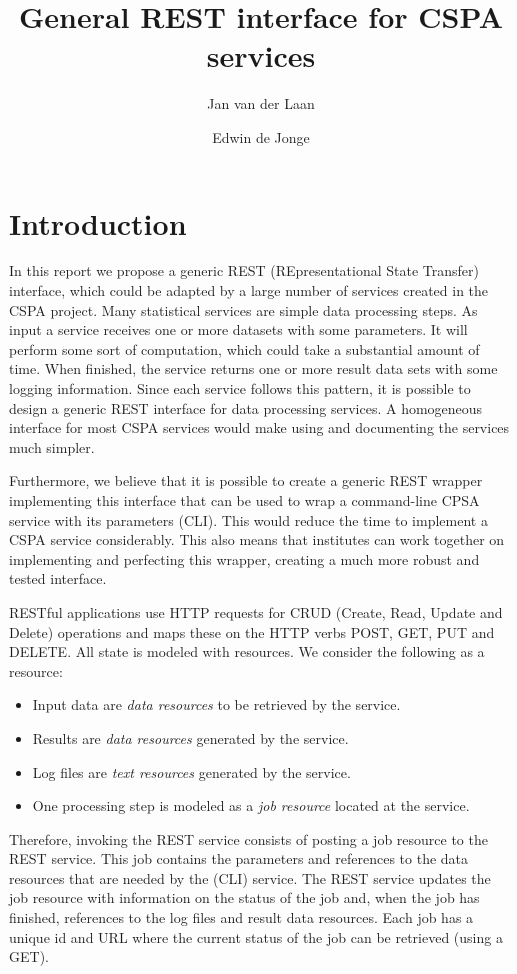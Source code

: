 \documentclass[a4paper]{article}
\title{General REST interface for CSPA services}
\author{Jan van der Laan \and Edwin de Jonge}
\begin{document}
\maketitle

\section{Introduction}

In this report we propose a generic REST (REpresentational State Transfer)
interface, which could be adapted by a large number of services created in the
CSPA project. Many statistical services are simple data processing steps. As 
input a service receives one or more datasets with some parameters. It will 
perform some sort of computation, which could take a substantial amount of time. 
When finished, the service returns one or more result data sets with some 
logging information.  Since
each service follows this pattern, it is possible to design a generic
REST interface for data processing services. 
A homogeneous interface for most CSPA services would make using and documenting 
the services much simpler. 

Furthermore, we believe that it is possible to create a generic REST wrapper implementing this interface that can be used to wrap a command-line CPSA service  with its parameters (CLI). This would
reduce the time to implement a CSPA service considerably.  This
also means that institutes can work together on implementing and perfecting this
wrapper, creating a much more robust and tested interface.

RESTful applications use HTTP requests for CRUD (Create, Read, Update and
Delete) operations and maps these on the HTTP verbs POST, GET, PUT and DELETE.
All state is modeled with resources. We consider the following as a resource:

\begin{itemize}
  \item Input data are \emph{data resources} to be retrieved by the service.
  \item Results are \emph{data resources} generated by the service.
  \item Log files are \emph{text resources} generated by the service.
  \item One processing step is modeled as a \emph{job resource} located at the
  service.
\end{itemize}

Therefore, invoking the REST service consists of posting a job resource to the REST service. This job contains the parameters and references
to the data resources that are needed by the (CLI) service. 
The REST service updates the job resource with
information on the status of the job and, when the job has finished, references
to the log files and result data resources. Each job has a unique id and URL where the current status of the job can be retrieved (using a GET). 
\end{document}
